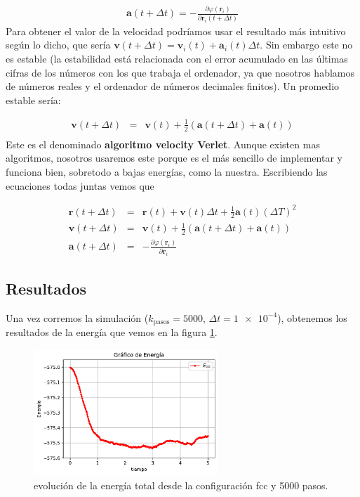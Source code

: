 \documentclass[11pt]{article} %
\newcommand{\parentesis}[1]{\left( #1  \right)}
\newcommand{\parciales}[2]{\frac{\partial #1}{\partial #2}}
\newcommand{\an}{\mathbf{a}}
\newcommand{\rn}{\mathbf{r}}
\newcommand{\vn}{\mathbf{v}}
\begin{document}
\begin{eqnarray}
	\an (t+\Delta t) = - \parciales{\varphi (\rn_i)}{\rn_{i}(t+\Delta t)}
\end{eqnarray}
Para obtener el valor de la velocidad podríamos usar el resultado más intuitivo según lo dicho, que sería $\vn(t+\Delta t) = \vn_i (t) + \an_i (t) \Delta t$. Sin embargo este no es estable (la estabilidad está relacionada con el error acumulado en las últimas cifras de los números con los que trabaja el ordenador, ya que nosotros hablamos de números reales y el ordenador de números decimales finitos). Un promedio estable sería:

\begin{eqnarray}
	\vn(t+\Delta t) & = & \vn(t) + \frac{1}{2} \parentesis{\an(t+\Delta t)+ \an(t)} \\
\end{eqnarray}
Este es el denominado \textbf{algoritmo velocity Verlet}. Aunque existen mas algoritmos, nosotros usaremos este porque es el más sencillo de implementar y funciona bien, sobretodo a bajas energías, como la nuestra. Escribiendo las ecuaciones todas juntas vemos que

\begin{eqnarray*}
	\rn(t+\Delta t) & = & \rn(t) + \vn(t) \Delta t + \frac{1}{2} \an (t) (\Delta T)^2 \\
	\vn(t+\Delta t) & = & \vn(t) + \frac{1}{2} \parentesis{\an(t+\Delta t)+ \an(t)} \\
	\an(t+\Delta t) & = &  - \parciales{\varphi(\rn_i)}{\rn_i}
\end{eqnarray*}


\subsection{Resultados}

Una vez corremos la simulación ($k_{\text{pasos}}=5000$, $\Delta t=\num{1e-4}$), obtenemos los resultados de la energía que vemos en la figura \ref{Fig:01}.  \newpage


\begin{figure}[h!] \centering
	\includegraphics[width=0.62\textwidth]{../../Graficas/Et-equilibra.pdf}
	\caption{evolución de la energía total desde la configuración fcc y 5000 pasos.}
	\label{Fig:01}
\end{figure}	
\end{document}
